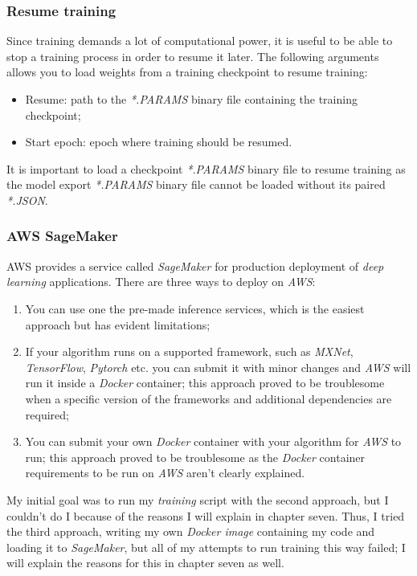\subsubsection{Resume training}
Since training demands a lot of computational power, it is useful to be able to stop a training process in order to resume it later. The following arguments allows you to load weights from a training checkpoint to resume training:
\begin{itemize}
	\item Resume: path to the \emph{*.PARAMS} binary file containing the training checkpoint;
	\item Start epoch: epoch where training should be resumed.
\end{itemize}
It is important to load a checkpoint \emph{*.PARAMS} binary file to resume training as the model export \emph{*.PARAMS} binary file cannot be loaded without its paired \emph{*.JSON}.

\subsubsection{AWS SageMaker}
AWS provides a service called \emph{SageMaker} for production deployment of \emph{deep learning} applications. There are three ways to deploy on \emph{AWS}:
\begin{enumerate}
	\item You can use one the pre-made inference services, which is the easiest approach but has evident limitations;
	\item If your algorithm runs on a supported framework, such as \emph{MXNet}, \emph{TensorFlow}, \emph{Pytorch} etc. you can submit it with minor changes and \emph{AWS} will run it inside a \emph{Docker} container; this approach proved to be troublesome when a specific version of the frameworks and additional dependencies are required;
	\item You can submit your own \emph{Docker} container with your algorithm for \emph{AWS} to run; this approach proved to be troublesome as the \emph{Docker} container requirements to be run on \emph{AWS} aren't clearly explained.
\end{enumerate}
My initial goal was to run my \emph{training} script with the second approach, but I couldn't do I because of the reasons I will explain in chapter seven. Thus, I tried the third approach, writing my own \emph{Docker image} containing my code and loading it to \emph{SageMaker}, but all of my attempts to run training this way failed; I will explain the reasons for this in chapter seven as well.

